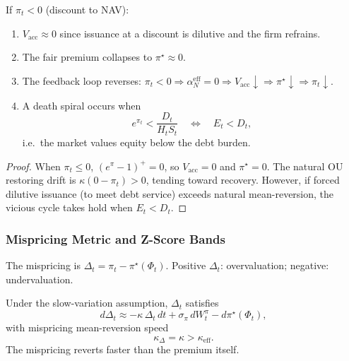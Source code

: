 \begin{theorem}
  \label{thm:death_spiral}
  If $\pi_t < 0$ (discount to NAV):
  \begin{enumerate}
    \item $V_{\mathrm{acc}} \approx 0$ since issuance at a discount is
      dilutive and the firm refrains.
    \item The fair premium collapses to $\pi^\star \approx 0$.
    \item The feedback loop reverses:
      $\pi_t < 0 \Rightarrow \alpha_N^{\mathrm{eff}} = 0 \Rightarrow
      V_{\mathrm{acc}} \downarrow \Rightarrow \pi^\star \downarrow
      \Rightarrow \pi_t \downarrow$.
    \item A death spiral occurs when
      \begin{equation}
        \label{eq:spiral_condition}
        e^{\pi_t} < \frac{D_t}{H_t S_t}
        \quad\Longleftrightarrow\quad
        E_t < D_t,
      \end{equation}
      i.e.\ the market values equity below the debt burden.
  \end{enumerate}
\end{theorem}

\begin{proof}
  When $\pi_t \le 0$, $(e^\pi - 1)^+ = 0$, so $V_{\mathrm{acc}} = 0$ and
  $\pi^\star = 0$.  The natural OU restoring drift is
  $\kappa(0 - \pi_t) > 0$, tending toward recovery.  However, if forced
  dilutive issuance (to meet debt service) exceeds natural mean-reversion,
  the vicious cycle takes hold when $E_t < D_t$.
\end{proof}

\subsubsection{Mispricing Metric and Z-Score Bands}
\label{sec:mispricing}

\begin{definition}
  \label{def:mispricing}
  The mispricing is $\Delta_t = \pi_t - \pi^\star(\Phi_t)$.
  Positive $\Delta_t$: overvaluation; negative: undervaluation.
\end{definition}

\begin{proposition}
  \label{prop:delta_dynamics}
  Under the slow-variation assumption, $\Delta_t$ satisfies
  \begin{equation}
    \label{eq:delta_ou}
    d\Delta_t \approx -\kappa\,\Delta_t\,dt
      + \sigma_\pi\,dW_t^\pi
      - d\pi^\star(\Phi_t),
  \end{equation}
  with mispricing mean-reversion speed
  \begin{equation}
    \label{eq:kappa_delta}
    \boxed{
      \kappa_\Delta = \kappa > \kappa_{\mathrm{eff}}.
    }
  \end{equation}
  The mispricing reverts faster than the premium itself.
\end{proposition}

